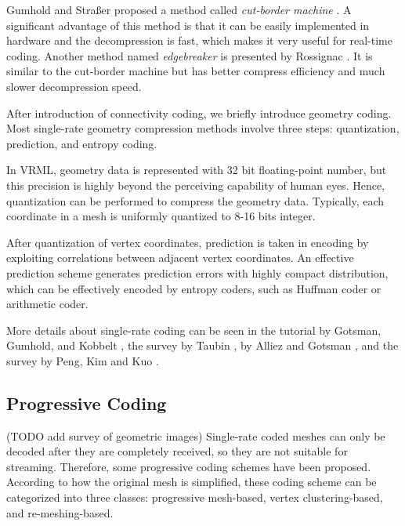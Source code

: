     Gumhold and Stra\ss{}er proposed a method called \emph{cut-border machine} \cite{280836}.
    A significant advantage of this method is that it can be easily implemented
    in hardware and the decompression is fast, which
    makes it very useful for real-time coding. 
    Another method named \emph{edgebreaker} is presented by Rossignac \cite{614421}.
    It is similar to the cut-border machine but has better
    compress efficiency and much slower decompression speed.
    
    After introduction of connectivity coding, we briefly introduce geometry
    coding. Most single-rate geometry compression methods involve three steps:
    quantization, prediction, and entropy coding.

    In VRML, geometry data is represented with 32 bit floating-point
    number, but this precision is highly beyond the perceiving
    capability of human eyes. Hence, quantization can be performed to
    compress the geometry data. Typically, each coordinate in a mesh is
    uniformly quantized to 8-16 bits integer.

    After quantization of vertex coordinates, prediction is taken in
    encoding by exploiting correlations between adjacent vertex
    coordinates. An effective prediction scheme generates prediction
    errors with highly compact distribution, which can be effectively
    encoded by entropy coders, such as Huffman coder or arithmetic
    coder. 

    More details about single-rate coding can be seen in the tutorial
    by Gotsman, Gumhold, and Kobbelt \cite{gotsman-simplification},
    the survey by Taubin \cite{3d:Taubin}, by Alliez and Gotsman
    \cite{recent:alliez}, and the survey by Peng, Kim and Kuo
    \cite{technologies:peng}.
    
    \subsection{Progressive Coding}
    (TODO add survey of geometric images)
    Single-rate coded meshes can only be decoded after they are
    completely received, so they are not suitable for streaming. Therefore,
    some progressive coding schemes have been proposed. According to
    how the original mesh is simplified, these coding scheme can be
    categorized into three classes: progressive mesh-based, vertex
    clustering-based, and re-meshing-based.
    
